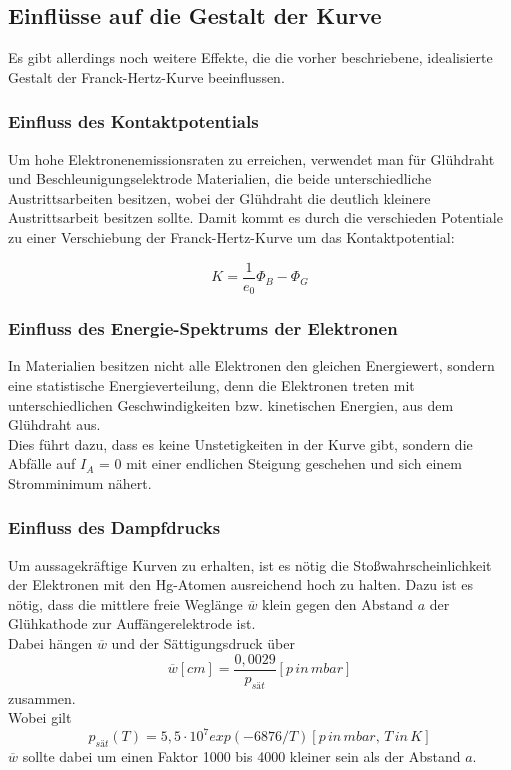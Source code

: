 \subsection{Einflüsse auf die Gestalt der Kurve}
Es gibt allerdings noch weitere Effekte, die die vorher beschriebene, idealisierte Gestalt der Franck-Hertz-Kurve beeinflussen.

\subsubsection{Einfluss des Kontaktpotentials}
Um hohe Elektronenemissionsraten zu erreichen, verwendet man für Glühdraht und Beschleunigungselektrode Materialien, die beide unterschiedliche Austrittsarbeiten besitzen, wobei der Glühdraht die deutlich kleinere Austrittsarbeit besitzen sollte. Damit kommt es durch die verschieden Potentiale zu einer Verschiebung der Franck-Hertz-Kurve um das Kontaktpotential:

\begin{equation}
K = \frac{1}{e_0}{\Phi_B - \Phi_G}
\end{equation}

\subsubsection{Einfluss des Energie-Spektrums der Elektronen}
In Materialien besitzen nicht alle Elektronen den gleichen Energiewert, sondern eine statistische Energieverteilung, denn die Elektronen treten mit unterschiedlichen Geschwindigkeiten bzw. kinetischen Energien, aus dem Glühdraht aus.\\
Dies führt dazu, dass es keine Unstetigkeiten in der Kurve gibt, sondern die Abfälle auf $I_A$ = 0 mit einer endlichen Steigung geschehen und sich einem Stromminimum nähert.\\

\subsubsection{Einfluss des Dampfdrucks}
Um aussagekräftige Kurven zu erhalten, ist es nötig die Stoßwahrscheinlichkeit der Elektronen mit den Hg-Atomen ausreichend hoch zu halten. Dazu ist es nötig, dass die mittlere freie Weglänge $\overline{w}$ klein gegen den Abstand $a$ der Glühkathode zur Auffängerelektrode ist.\\
Dabei hängen $\overline{w}$ und der Sättigungsdruck über
\begin{equation}
\overline{w} [cm] = \frac{0,0029}{p_{sät}} [p \, in \, mbar]
\end{equation}
zusammen.\\

Wobei gilt
\begin{equation}
p_{sät}(T) = 5,5 \cdot 10^{7} exp(-6876/T) [p \, in \, mbar, \, T \, in \, K]
\end{equation}
$\overline{w}$ sollte dabei um einen Faktor 1000 bis 4000 kleiner sein als der Abstand $a$.
